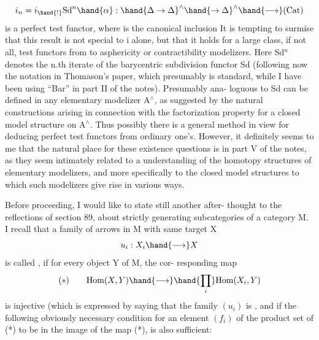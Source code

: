 \[i_n = i_{\hand{!}}\mathrm{Sd}^n\hand{\alpha} : \hand{\Delta\to\Delta}^{\wedge}\hand{\to\Delta}^{\wedge}\hand{\longrightarrow}(\mathrm{Cat})\]
is a perfect test functor, where \hand{$\alpha\textcolor{black}{:}\Delta\to\Delta^{\textcolor{black}{\wedge}}$} is the canonical inclusion
It is tempting to surmise that this result is not special to i alone,
but that it holds for a large class, if not all, test functors from
\hand{$\Delta$} to asphericity or contractibility modelizers. Here Sd$^n$ denotes the
n.th iterate of the barycentric subdivision functor Sd (following
now the notation in Thomason's paper, which presumably is standard,
while I have been using ``Bar'' in part II of the notes). Presumably  ana-%
loguous  to Sd can be defined in any elementary modelizer A$^\wedge$,
as suggested by the natural constructions arising\unsure{\xout{,}} in connection with
the factorization property for a closed model structure on A$^\wedge$. Thus
possibly there is a general method in view for deducing perfect test
functors from ordinary one's. However, it definitely seems to me that
the natural place for these existence questions is in part V of the
notes, as they seem intimately related to a  understanding of
the homotopy structures of  elementary modelizers, and more
specifically to the closed model structures to which such modelizers
give rise in various ways.


Before proceeding, I would like to state still another after-%
thought to the reflections of section 89, about strictly generating
subcategories of a category M. I recall that a family of arrows in M
with same target X
\[u_i : X_i \hand{\longrightarrow} X\]
is called \hand{\uline{\textcolor{black}{strictly}}} \hand{\uline{\textcolor{black}{epimorphic}}} , if for every object Y of M, the cor-%
responding map
\[(*)\qquad \mathrm{Hom}(X,Y)\hand{\longrightarrow} \hand{\prod_{i}}\mathrm{Hom}(X_i,Y)\]
is injective (which is expressed by saying that the family $(u_i)$ is
\hand{\uline{\textcolor{black}{epimorphic}}} , and if \hand{\uline{\textcolor{black}{moreover}}} the  following obviously
necessary condition for an element $(f_i)$ of the product set of (*) to
be in the image of the map (*), is also sufficient:

